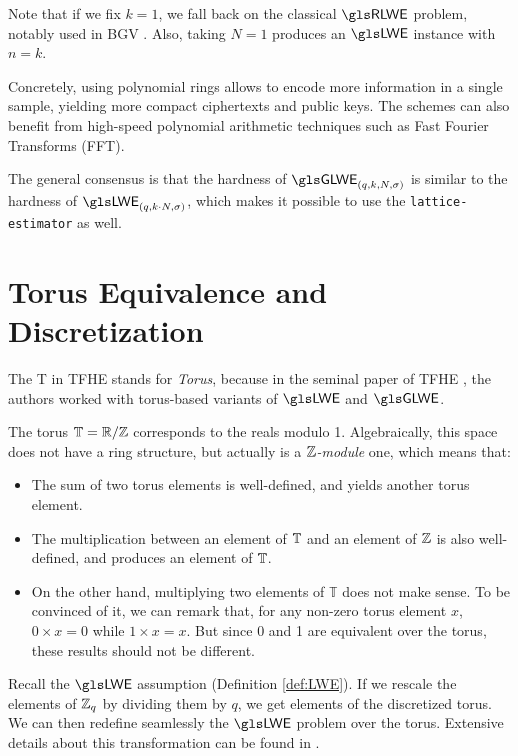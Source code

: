 Note that if we fix $k = 1$, we fall back on the classical $\RLWE$ problem, notably used in BGV \cite{bgv}. Also, taking $N=1$ produces an $\LWE$ instance with $n = k$. 

Concretely, using polynomial rings allows to encode more information in a single sample, yielding more compact ciphertexts and public keys. The schemes can also benefit from high-speed polynomial arithmetic techniques such as Fast Fourier Transforms (FFT). 

The general consensus is that the hardness of $\GLWE_{(q, k, N, \sigma)}$ is similar to the hardness of $\LWE_{(q, k \cdot N, \sigma)}$, which makes it possible to use the \texttt{lattice-estimator} as well.


\section{Torus Equivalence and Discretization}
\label{sec:torus_equivalence}


The T in \gls{TFHE} stands for \textit{Torus}, because in the seminal paper of \gls{TFHE} \cite{JC:CGGI20}, the authors worked with torus-based variants of $\LWE$ and $\GLWE$.


The torus $\mathbb{T} = \mathbb{R} / \mathbb{Z}$ corresponds to the reals modulo 1. Algebraically, this space does not have a ring structure, but actually is a \textit{$\mathbb{Z}$-module} one, which means that:

\begin{itemize}
	\item The sum of two torus elements is well-defined, and yields another torus element.
	\item The multiplication between an element of $\mathbb{T}$ and an element of $\mathbb{Z}$ is also well-defined, and produces an element of $\mathbb{T}$.
	\item On the other hand, multiplying two elements of $\mathbb T$ does not make sense. To be convinced of it, we can remark that, for any non-zero torus element $x$, $0 \times x = 0$ while $1 \times x = x$. But since 0 and 1 are equivalent over the torus, these results should not be different. 
\end{itemize}



Recall the $\LWE$ assumption (Definition \ref{def:LWE}). If we rescale the elements of $\mathbb{Z}_q$ by dividing them by $q$, we get elements of the discretized torus. We can then redefine seamlessly the $\LWE$ problem over the torus. Extensive details about this transformation can be found in \cite{these_chillotti}.


